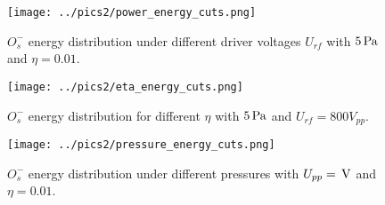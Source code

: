 \begin{figure}[htbp]
    \centering
    \texttt{[image: ../pics2/power\_energy\_cuts.png]}
    \caption{$O_s^-$ energy distribution under different driver voltages $U_{rf}$ with $5\,\mathrm{Pa}$ and $\eta=0.01$.}
    \label{fig:voltage}
\end{figure}

\begin{figure}[htbp]
    \centering
    \texttt{[image: ../pics2/eta\_energy\_cuts.png]}
    \caption{$O_s^-$ energy distribution for different $\eta$ with $5\,\mathrm{Pa}$ and $U_{rf}=800V_{pp}$.}
    \label{fig:eta}
\end{figure}


\begin{figure}[htbp]
    \centering
    \texttt{[image: ../pics2/pressure\_energy\_cuts.png]}
    \caption{$O_s^-$ energy distribution under different pressures with $U_{pp}=\,\mathrm{V}$ and $\eta=0.01$.}
    \label{fig:pressure}
\end{figure}






